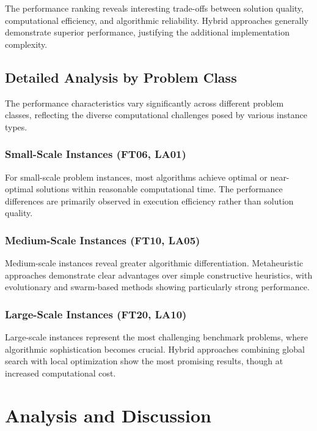 \documentclass[11pt,a4paper]{article}
\begin{document}
The performance ranking reveals interesting trade-offs between solution quality, computational efficiency, and algorithmic reliability. Hybrid approaches generally demonstrate superior performance, justifying the additional implementation complexity.




\subsection{Detailed Analysis by Problem Class}

The performance characteristics vary significantly across different problem classes, reflecting the diverse computational challenges posed by various instance types.


\subsubsection{Small-Scale Instances (FT06, LA01)}

For small-scale problem instances, most algorithms achieve optimal or near-optimal solutions within reasonable computational time. The performance differences are primarily observed in execution efficiency rather than solution quality.

\subsubsection{Medium-Scale Instances (FT10, LA05)}

Medium-scale instances reveal greater algorithmic differentiation. Metaheuristic approaches demonstrate clear advantages over simple constructive heuristics, with evolutionary and swarm-based methods showing particularly strong performance.

\subsubsection{Large-Scale Instances (FT20, LA10)}

Large-scale instances represent the most challenging benchmark problems, where algorithmic sophistication becomes crucial. Hybrid approaches combining global search with local optimization show the most promising results, though at increased computational cost.


\section{Analysis and Discussion}
\end{document}
